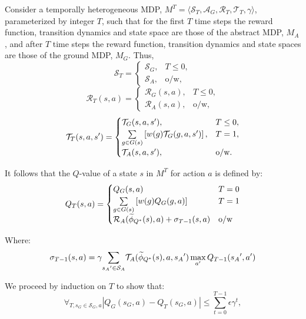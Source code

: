 Consider a temporally heterogeneous \ac{MDP}, $M^T = \langle \mathcal{S}_T, \mathcal{A}_G, \mathcal{R}_T, \mathcal{T}_T, \gamma \rangle$, parameterized by integer $T$, such that for the first $T$ time steps the reward function, transition dynamics and state space are those of the abstract MDP, $M_A$, and after $T$ time steps the reward function, transition dynamics and state spaces are those of the ground MDP, $M_G$. Thus,
\begin{equation}
\mathcal{S}_T = \begin{cases}
\mathcal{S}_G,& T \leq 0, \\
\mathcal{S}_A,& \text{o/w},
\end{cases}
\end{equation}
\begin{equation}
\mathcal{R}_T(s,a) = \begin{cases}
\mathcal{R}_G(s,a),& T \leq 0, \\
\mathcal{R}_A(s, a),& \text{o/w},
\end{cases}
\end{equation}
\begin{equation}
\mathcal{T}_T(s,a,s') = \begin{cases}
\mathcal{T}_G(s,a,s'),& T \leq 0, \\
\underset{{g \in G(s)}}{\sum}\left[w(g)\mathcal{T}_G(g, a, s')\right],& T = 1, \\
\mathcal{T}_A(s,a,s'),& \text{o/w}.
\end{cases}
\end{equation}

It follows that the $Q$-value of a state $s$ in $M^T$ for action $a$ is defined by:
\begin{equation}
Q_T(s, a) = 
\begin{cases}
	   Q_G(s, a) &  T=0\\
	   \underset{g \in G(s)}{\sum} \left[ w(g)Q_G(g,a) \right] & T = 1\\
	   \mathcal{R}_A(\widetilde \phi_{Q^*}(s),a) + \sigma_{T-1}(s,a) &\text{o/w}

\end{cases}
\end{equation}

Where:
\begin{equation}
\sigma_{T-1}(s,a) = \gamma \underset{{s_A}' \in \mathcal{S}_A}{\sum} \mathcal{T}_A(\widetilde \phi_{Q^*}(s),a,{s_A}') \max_{a'} Q_{T-1}({s_A}', a')
\end{equation}

We proceed by induction on $T$ to show that:
\begin{equation}
\forall_{T, s_G \in \mathcal{S}_G, a} |Q_G(s_G, a) - Q_T(s_G, a)| \leq \sum_{t=0}^{T-1} \epsilon \gamma^{t},
\end{equation}


